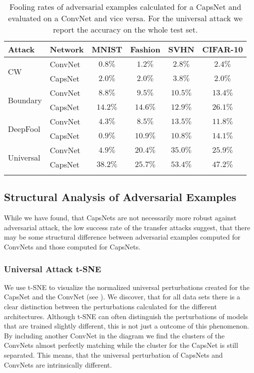 		
\begin{table}
	\centering
	\begin{tabular}{llcccc}
		\toprule
		Attack & Network       & MNIST & Fashion & SVHN & CIFAR-10  \\
		\midrule
		\multirow{2}{*}{CW} & ConvNet & $0.8\%$ & $1.2\%$ & $2.8\%$ & $2.4\%$ \\
		& CapsNet            & $2.0\%$ & $2.0\%$ & $3.8\%$ & $2.0\%$ \\
		\midrule
		\multirow{2}{*}{Boundary} & ConvNet & $8.8\%$ & $9.5\%$ & $10.5\%$ & $13.4\%$ \\
		& CapsNet            & $14.2\%$ & $14.6\%$ & $12.9\%$ & $26.1\%$ \\
		\midrule
		\multirow{2}{*}{DeepFool} & ConvNet & $4.3\%$ & $8.5\%$ & $13.5\%$ & $11.8\%$ \\
		& CapsNet           & $0.9\%$ & $10.9\%$ & $10.8\%$ & $14.1\%$ \\
		\midrule
		\multirow{2}{*}{Universal} & ConvNet & $4.9\%$ & $20.4\%$ & $35.0\%$ & $25.9\%$ \\
		& CapsNet           & $38.2\%$ & $25.7\%$ & $53.4\%$ & $47.2\%$ \\
		\bottomrule\\
	\end{tabular}
	\caption[Transfer Fooling Rates]{Fooling rates of adversarial examples calculated for a CapsNet and evaluated on a ConvNet and vice versa. For the universal attack we report the accuracy on the whole test set.}
	\label{tab:transfer}
\end{table}

\subsection{Structural Analysis of Adversarial Examples}

While we have found, that CapsNets are not necessarily more robust against adversarial attack, the low success rate of the transfer attacks suggest, that there may be some structural difference between adversarial examples computed for ConvNets and those computed for CapsNets.

\subsubsection{Universal Attack t-SNE}

We use t-SNE \citep{tsne} to visualize the normalized universal perturbations created for the CapsNet and the ConvNet (see ).
We discover, that for all data sets there is a clear distinction between the perturbations calculated for the different architectures.
Although t-SNE can often distinguish the perturbations of models that are trained slightly different, this is not just a outcome of this phenomenon.
By including another ConvNet in the diagram we find the clusters of the ConvNets almost perfectly matching while the cluster for the CapsNet is still separated.
This means, that the universal perturbation of CapsNets and ConvNets are intrinsically different.


